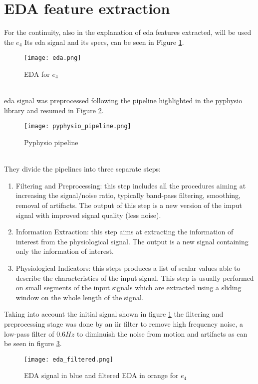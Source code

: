 \section{EDA feature extraction}
For the continuity, also in the explanation of \gls{eda} features extracted, will be used the $e_4$ Its \gls{eda} signal and its specs, can be seen in Figure \ref{fig:eda}.
\begin{figure}[h]
    \centering
    \texttt{[image: eda.png]} 
	\caption{EDA for $e_4$}
    \label{fig:eda}
\end{figure}
\\
\gls{eda} signal was preprocessed following the pipeline highlighted in the pyphysio library \cite{bizzego2019pyphysio} and resumed in Figure \ref{fig:pyphysio_pipeline}.
\begin{figure}[h]
    \centering
    \texttt{[image: pyphysio\_pipeline.png]} 
	\caption{Pyphysio pipeline}
    \label{fig:pyphysio_pipeline}
\end{figure}
\\
They divide the pipelines into three separate steps:
\begin{enumerate}
	\item Filtering and Preprocessing: this step includes all the procedures aiming at increasing the signal/noise ratio, typically band-pass filtering, smoothing, removal of artifacts. The output of this step is a new version of the imput signal with improved signal quality (less noise).
	\item Information Extraction: this step aims at extracting the information of interest from the physiological signal. The output is a new signal containing only the information of interest.
	\item Physiological Indicators: this steps produces a list of scalar values able to describe the characteristics of the input signal. This step is usually performed on small segments of the input signals which are extracted using a sliding window on the whole length of the signal.
\end{enumerate}
Taking into account the initial signal shown in figure \ref{fig:eda} the filtering and preprocessing stage was done by an \gls{iir} filter to remove high frequency noise, a low-pass filter of $0.6Hz$ to diminuish the noise from motion and artifacts as can be seen in figure \ref{fig:eda_filtered}.
\begin{figure}[h]
    \centering
    \texttt{[image: eda\_filtered.png]} 
	\caption{EDA signal in blue and filtered EDA in orange for $e_4$}
    \label{fig:eda_filtered}
\end{figure}
